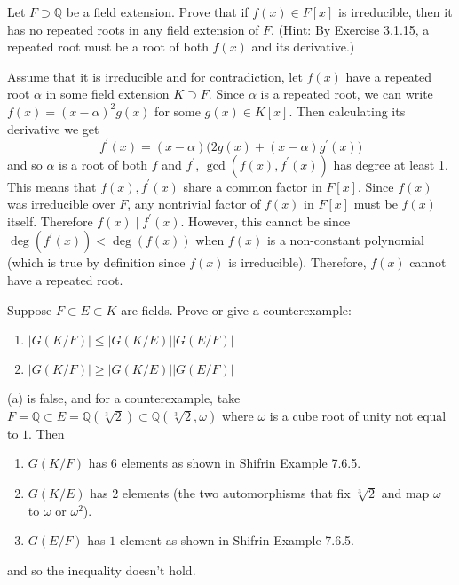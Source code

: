   \begin{exercise}[Shifrin 7.6.2]
    Let $F \supset \mathbb{Q}$ be a field extension. Prove that if $f(x) \in F[x]$ is irreducible, then it has no repeated roots in any field extension of $F$. (Hint: By Exercise 3.1.15, a repeated root must be a root of both $f(x)$ and its derivative.)
  \end{exercise}
  \begin{solution}
    Assume that it is irreducible and for contradiction, let $f(x)$ have a repeated root $\alpha$ in some field extension $K \supset F$. Since $\alpha$ is a repeated root, we can write $f(x) = (x - \alpha)^2 g(x)$ for some $g(x) \in K[x]$. Then calculating its derivative we get 
    \begin{equation}
      f^\prime (x) = (x - \alpha) \big( 2 g(x) + (x - \alpha) g^\prime (x) \big)
    \end{equation}
    and so $\alpha$ is a root of both $f$ and $f^\prime$, $\gcd(f(x), f^\prime(x))$ has degree at least 1. This means that $f(x), f^\prime (x)$ share a common factor in $F[x]$. Since $f(x)$ was irreducible over $F$, any nontrivial factor of $f(x)$ in $F[x]$ must be $f(x)$ itself. Therefore $f(x) \mid f^\prime (x)$. However, this cannot be since $\deg(f^\prime(x)) < \deg(f(x))$ when $f(x)$ is a non-constant polynomial (which is true by definition since $f(x)$ is irreducible). Therefore, $f(x)$ cannot have a repeated root. 
  \end{solution}

  \begin{exercise}[Shifrin 7.6.10]
    Suppose $F \subset E \subset K$ are fields. Prove or give a counterexample:
    \begin{enumerate}[label=\alph*.]
      \item $|G(K/F)| \leq |G(K/E)||G(E/F)|$
      \item $|G(K/F)| \geq |G(K/E)||G(E/F)|$
    \end{enumerate}
  \end{exercise}
  \begin{solution}
    (a) is false, and for a counterexample, take $F = \mathbb{Q}  \subset E = \mathbb{Q}(\sqrt[3]{2}) \subset \mathbb{Q}(\sqrt[3]{2}, \omega)$ where $\omega$ is a cube root of unity not equal to $1$. Then 
    \begin{enumerate}
      \item $G(K/F)$ has $6$ elements as shown in Shifrin Example 7.6.5. 
      \item $G(K/E)$ has $2$ elements (the two automorphisms that fix $\sqrt[3]{2}$ and map $\omega$ to $\omega$ or $\omega^2$). 
      \item $G(E/F)$ has $1$ element as shown in Shifrin Example 7.6.5. 
    \end{enumerate}
    and so the inequality doesn't hold. 
  \end{solution}

